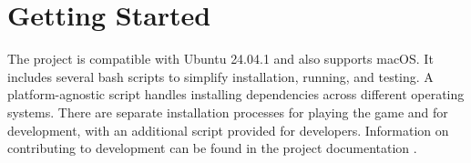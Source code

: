 



\section{Getting Started}
The project is compatible with Ubuntu 24.04.1 and also supports macOS. 
It includes several bash scripts to simplify installation, running, and testing. 
A platform-agnostic script handles installing dependencies across different operating systems. 
There are separate installation processes for playing the game and for development, with an additional script provided for developers. 
Information on contributing to development can be found in the project documentation \cite{ProjectWiki}.

